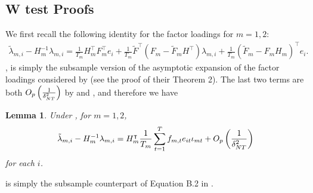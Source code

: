 \documentclass[12pt]{article}
\newtheorem{lemma}{Lemma}
\newcommand*{\tran}{\intercal}
\theoremstyle{plain}
\numberwithin{equation}{section}
\begin{document}
\subsection{W test Proofs}
We first recall the following identity for the factor loadings for $m = 1, 2$:
\begin{align}
\label{eqn:loading_asymp_exp}
\tilde{\lambda}_{m, i} - H_m^{-1} \lambda_{m, i} = \frac{1}{T_m} H_m^\tran F_m^\tran e_i + \frac{1}{T_m}\tilde{F}^\tran (F_m - \tilde{F}_m H^\tran)\lambda_{m, i} + \frac{1}{T_m} (\tilde{F}_m - F_m H_m)^\tran e_i.
\end{align}
, is simply the subsample version of the asymptotic expansion of the factor loadings considered by \textcite{bai_inferential_2003} (see the proof of their Theorem 2). The last two terms are both $O_p\left( \frac{1}{\delta_{NT}^2}\right)$ by  and , and therefore we have
\begin{lemma}
\label{lem:bai_inf:7:B.2}
Under , for $m = 1, 2$,
\begin{align}
\tilde{\lambda}_{m, i} - H_m^{-1} \lambda_{m, i} = 
H_m^\tran \frac{1}{T_m} \sumT f_{m, t} e_{it} \iota_{mt} + \Opdeltasq
\end{align}
for each $i$.
\end{lemma}
 is simply the subsample counterpart of Equation B.2 in \textcite{bai_inferential_2003}.
\end{document}
